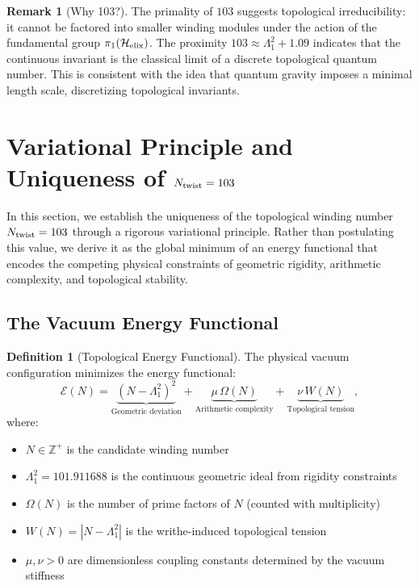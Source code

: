 \documentclass[12pt, a4paper]{article}
\theoremstyle{definition}
\newtheorem{definition}[theorem]{Definition}
\newtheorem{remark}[theorem]{Remark}
\newcommand{\bbZ}{\mathbb{Z}}
\newcommand{\Hel}{\mathcal{H}_{\rm elix}}
\begin{document}
\begin{remark}[Why 103?]
The primality of $103$ suggests topological irreducibility: it cannot be factored into smaller winding modules under the action of the fundamental group $\pi_1(\Hel)$. The proximity $103 \approx \Lambda_1^2 + 1.09$ indicates that the continuous invariant is the classical limit of a discrete topological quantum number. This is consistent with the idea that quantum gravity imposes a minimal length scale, discretizing topological invariants.
\end{remark}

\section{Variational Principle and Uniqueness of $N_{\rm twist} = 103$}
\label{sec:variational}

In this section, we establish the uniqueness of the topological winding number $N_{\rm twist} = 103$ through a rigorous variational principle. Rather than postulating this value, we derive it as the global minimum of an energy functional that encodes the competing physical constraints of geometric rigidity, arithmetic complexity, and topological stability.

\subsection{The Vacuum Energy Functional}

\begin{definition}[Topological Energy Functional]
The physical vacuum configuration minimizes the energy functional:
\begin{equation}
\mathcal{E}(N) = \underbrace{(N - \Lambda_1^2)^2}_{\text{Geometric deviation}} + \underbrace{\mu \, \Omega(N)}_{\text{Arithmetic complexity}} + \underbrace{\nu \, W(N)}_{\text{Topological tension}},
\label{eq:energy-functional}
\end{equation}
where:
\begin{itemize}
    \item $N \in \bbZ^+$ is the candidate winding number
    \item $\Lambda_1^2 = 101.911688$ is the continuous geometric ideal from rigidity constraints
    \item $\Omega(N)$ is the number of prime factors of $N$ (counted with multiplicity)
    \item $W(N) = |N - \Lambda_1^2|$ is the writhe-induced topological tension
    \item $\mu, \nu > 0$ are dimensionless coupling constants determined by the vacuum stiffness
\end{itemize}
\end{definition}
\end{document}
